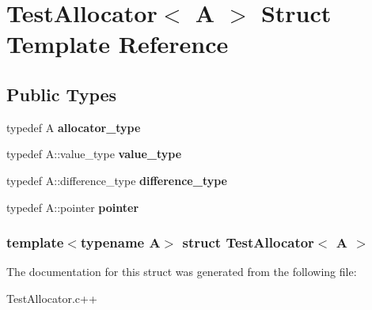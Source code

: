 \hypertarget{structTestAllocator}{\section{\-Test\-Allocator$<$ \-A $>$ \-Struct \-Template \-Reference}
\label{structTestAllocator}
}
\subsection*{\-Public \-Types}
\begin{DoxyCompactItemize}
\item 
\hypertarget{structTestAllocator_af8efd777e4901f5fe89963b705a9ec46}{typedef \-A {\bfseries allocator\-\_\-type}}\label{structTestAllocator_af8efd777e4901f5fe89963b705a9ec46}

\item 
\hypertarget{structTestAllocator_a51c2d3916b54b7daf51d54916b1e4c2b}{typedef \-A\-::value\-\_\-type {\bfseries value\-\_\-type}}\label{structTestAllocator_a51c2d3916b54b7daf51d54916b1e4c2b}

\item 
\hypertarget{structTestAllocator_ac3c65cec130a0c773dba9cd64477b72d}{typedef \-A\-::difference\-\_\-type {\bfseries difference\-\_\-type}}\label{structTestAllocator_ac3c65cec130a0c773dba9cd64477b72d}

\item 
\hypertarget{structTestAllocator_a77c16c448bacf290ba630694fe9e4358}{typedef \-A\-::pointer {\bfseries pointer}}\label{structTestAllocator_a77c16c448bacf290ba630694fe9e4358}

\end{DoxyCompactItemize}
\subsubsection*{template$<$typename A$>$ struct Test\-Allocator$<$ A $>$}



\-The documentation for this struct was generated from the following file\-:\begin{DoxyCompactItemize}
\item 
\-Test\-Allocator.\-c++\end{DoxyCompactItemize}
